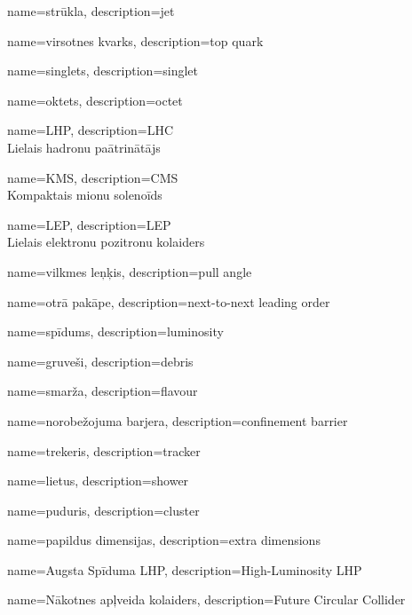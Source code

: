 {
  name=strūkla,
  description={jet}
}

{
  name=virsotnes kvarks,
  description={top quark}
}

{
  name=singlets,
  description={singlet}
}

{
  name=oktets,
  description={octet}
}

{
  name=LHP,
  description={LHC\\Lielais hadronu paātrinātājs}
}

{
  name=KMS,
  description={CMS\\Kompaktais mionu solenoīds}
}

{
  name=LEP,
  description={LEP\\Lielais elektronu pozitronu kolaiders}
}

{
  name=vilkmes leņķis,
  description={pull angle}
}

{
  name=otrā pakāpe,
  description={next-to-next leading order}
}


{
  name=spīdums,
  description={luminosity}
}

{
        name=gruveši,
        description={debris}
}

{
        name=smarža,
        description={flavour}
}

{
        name=norobežojuma barjera,
        description={confinement barrier}
}

{
        name=trekeris,
        description={tracker}
}

{
        name=lietus,
        description={shower}
}

{
        name=puduris,
        description={cluster}
}

{
        name=papildus dimensijas,
        description={extra dimensions}
}

{
        name=Augsta Spīduma LHP,
        description={High-Luminosity LHP}
}

{
        name=Nākotnes apļveida kolaiders,
        description={Future Circular Collider}
}

